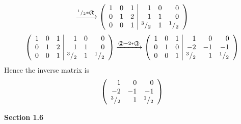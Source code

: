 \documentclass[8pt]{article} %
\begin{document}
\begin{enumerate}[1]
\begin{enumerate}[(a)]
\[\xrightarrow{\text{${^{1}/_{2}}*$\textcircled{3}}}\left(\begin{array}{rrr|rrr}
1&0&1&1&0&0\\
0&1&2&1&1&0\\
0&0&1&{^{3}/_{2}}&1&{^{1}/_{2}}\\
\end{array}\right)
\]\[\left(\begin{array}{rrr|rrr}
1&0&1&1&0&0\\
0&1&2&1&1&0\\
0&0&1&{^{3}/_{2}}&1&{^{1}/_{2}}\\
\end{array}\right)
\xrightarrow{\text{\textcircled{2}$-2*$\textcircled{3}}}\left(\begin{array}{rrr|rrr}
1&0&1&1&0&0\\
0&1&0&-2&-1&-1\\
0&0&1&{^{3}/_{2}}&1&{^{1}/_{2}}\\
\end{array}\right)
\]
Hence the inverse matrix is
\[\left(\begin{array}{rrr}
1&0&0\\
-2&-1&-1\\
{^{3}/_{2}}&1&{^{1}/_{2}}\\
\end{array}\right)
\]
	\end{enumerate}
\end{enumerate}
\textbf{Section 1.6}
\end{document}

